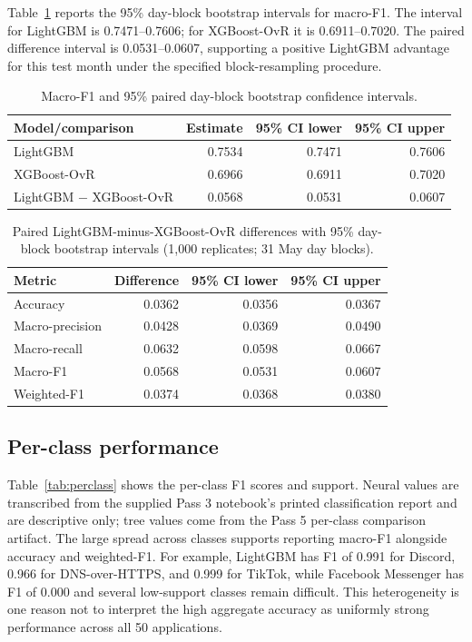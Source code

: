 \documentclass[conference]{IEEEtran}
\begin{document}
Table~\ref{tab:ci} reports the 95\% day-block bootstrap intervals for macro-F1. The interval for LightGBM is 0.7471--0.7606; for XGBoost-OvR it is 0.6911--0.7020. The paired difference interval is 0.0531--0.0607, supporting a positive LightGBM advantage for this test month under the specified block-resampling procedure.

\begin{table}[t]
\centering
\caption{Macro-F1 and 95\% paired day-block bootstrap confidence intervals.}
\label{tab:ci}
\begin{tabular}{lrrr}
\toprule
Model/comparison & Estimate & 95\% CI lower & 95\% CI upper\\
\midrule
LightGBM & 0.7534 & 0.7471 & 0.7606\\
XGBoost-OvR & 0.6966 & 0.6911 & 0.7020\\
LightGBM $-$ XGBoost-OvR & 0.0568 & 0.0531 & 0.0607\\
\bottomrule
\end{tabular}
\end{table}

\begin{table}[t]
\centering
\caption{Paired LightGBM-minus-XGBoost-OvR differences with 95\% day-block bootstrap intervals (1,000 replicates; 31 May day blocks).}
\label{tab:diff}
\begin{tabular}{lrrr}
\toprule
Metric & Difference & 95\% CI lower & 95\% CI upper\\
\midrule
Accuracy & 0.0362 & 0.0356 & 0.0367\\
Macro-precision & 0.0428 & 0.0369 & 0.0490\\
Macro-recall & 0.0632 & 0.0598 & 0.0667\\
Macro-F1 & 0.0568 & 0.0531 & 0.0607\\
Weighted-F1 & 0.0374 & 0.0368 & 0.0380\\
\bottomrule
\end{tabular}
\end{table}

\subsection{Per-class performance}

Table~\ref{tab:perclass} shows the per-class F1 scores and support. Neural values are transcribed from the supplied Pass 3 notebook's printed classification report and are descriptive only; tree values come from the Pass 5 per-class comparison artifact. The large spread across classes supports reporting macro-F1 alongside accuracy and weighted-F1. For example, LightGBM has F1 of 0.991 for Discord, 0.966 for DNS-over-HTTPS, and 0.999 for TikTok, while Facebook Messenger has F1 of 0.000 and several low-support classes remain difficult. This heterogeneity is one reason not to interpret the high aggregate accuracy as uniformly strong performance across all 50 applications.
\end{document}
